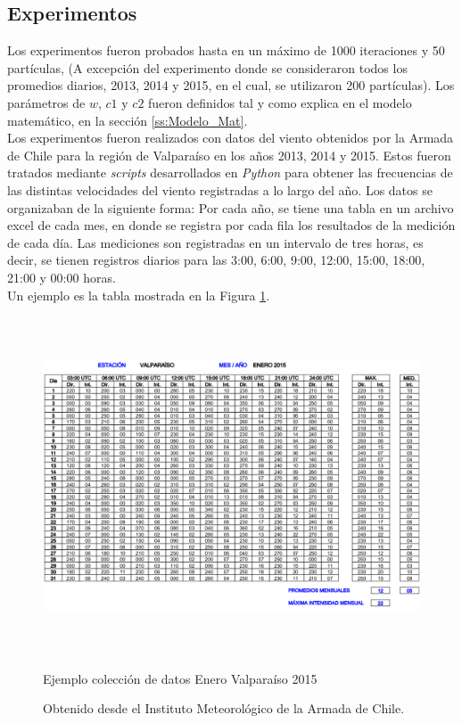 \subsection{Experimentos}
Los experimentos fueron probados hasta en un máximo de 1000 iteraciones y 50 partículas, (A excepción del experimento donde se consideraron todos los promedios diarios, 2013, 2014 y 2015, en el cual, se utilizaron 200 partículas). Los parámetros de $w$, $c1$ y $c2$ fueron definidos tal y como explica en el modelo matemático, en la sección \ref{ss:Modelo_Mat}.\\
Los experimentos fueron realizados con datos del viento obtenidos por la Armada de Chile para la región de Valparaíso en los años 2013, 2014 y 2015. Estos fueron tratados mediante \emph{scripts} desarrollados en \emph{Python} para obtener las frecuencias de las distintas velocidades del viento registradas a lo largo del año. Los datos se organizaban de la siguiente forma: Por cada año, se tiene una tabla en un archivo excel de cada mes, en donde se registra por cada fila los resultados de la medición de cada día. Las mediciones son registradas en un intervalo de tres horas, es decir, se tienen registros diarios para las 3:00, 6:00, 9:00, 12:00, 15:00, 18:00, 21:00 y 00:00 horas.\\
Un ejemplo es la tabla mostrada en la Figura \ref{fig:example_data}.
 \begin{figure}[h!]
    \centering
    \includegraphics[height=100mm]{figures/example_data.png}
    \caption{Ejemplo colección de datos Enero Valparaíso 2015}
    \vspace{-.25cm}
    \caption*{Obtenido desde el Instituto Meteorológico de la Armada de Chile.}
    \label{fig:example_data}
 \end{figure}

